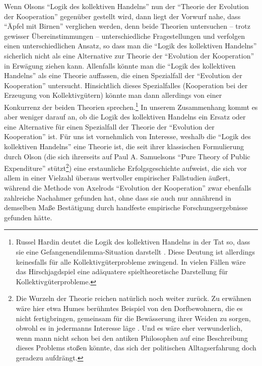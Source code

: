 \documentclass[12pt,a4paper,ngerman]{article}
\begin{document}
Wenn Olsons "`Logik des kollektiven Handelns"' nun der "`Theorie der
Evolution der Kooperation"' gegenüber gestellt wird, dann liegt der
Vorwurf nahe, dass "`Äpfel mit Birnen"' verglichen werden, denn beide
Theorien untersuchen -- trotz gewisser Übereinstimmungen --
unterschiedliche Fragestellungen und verfolgen einen unterschiedlichen
Ansatz, so dass man die "`Logik des kollektiven Handelns"' sicherlich
nicht als eine Alternative zur Theorie der "`Evolution der
Kooperation"' in Erwägung ziehen kann. Allenfalls könnte man die
"`Logik des kollektiven Handelns"' als eine Theorie auffassen, die
einen Spezialfall der "`Evolution der Kooperation"' untersucht.
Hinsichtlich dieses Spezialfalles (Kooperation bei der Erzeugung von
Kollektivgütern) könnte man dann allerdings von einer Konkurrenz der
beiden Theorien sprechen.\footnote{Russel Hardin deutet die Logik des
  kollektiven Handelns in der Tat so, dass sie eine
  Gefangenendilemma-Situation darstellt \cite[S. 16ff.]{hardin:1982}.
  Diese Deutung ist allerdings keinesfalls für alle
  Kollektivgüterprobleme zwingend. In vielen Fällen wäre das
  Hirschjagdspiel eine adäquatere spieltheoretische Darstellung für
  Kollektivgüterprobleme.} In unserem Zusammenhang kommt es aber
weniger darauf an, ob die Logik des kollektiven Handelns ein Ersatz
oder eine Alternative für einen Spezialfall der Theorie der
"`Evolution der Kooperation"' ist. Für uns ist vornehmlich von
Interesse, weshalb die "`Logik des kollektiven Handelns"' eine Theorie
ist, die seit ihrer klassischen Formulierung durch Olson (die sich
ihrerseits auf Paul A. Samuelsons "`Pure Theory of Public
Expenditure"' stützt\footnote{Die Wurzeln der Theorie reichen
  natürlich noch weiter zurück. Zu erwähnen wäre hier etwa Humes
  berühmtes Beispiel von den Dorfbewohnern, die es nicht
  fertigbringen, gemeinsam für die Bewässerung ihrer Weiden zu sorgen,
  obwohl es in jedermanns Interesse läge \cite[S. 590]{hume:1739}. Und
  es wäre eher verwunderlich, wenn mann nicht schon bei den antiken
  Philosophen auf eine Beschreibung dieses Problems stoßen könnte, das
  sich der politischen Alltagserfahrung doch geradezu aufdrängt.})
eine erstaunliche Erfolgsgeschichte aufweist, die sich vor allem in
einer Vielzahl überaus wertvoller empirischer Fallstudien äußert,
während die Methode von Axelrods "`Evolution der Kooperation"' zwar
ebenfalls zahlreiche Nachahmer gefunden hat, ohne dass sie auch nur
annährend in demselben Maße Bestätigung durch handfeste empirische
Forschungsergebnisse gefunden hätte.
\end{document}

